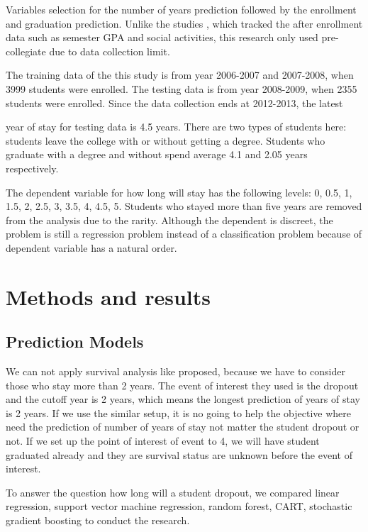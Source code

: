 \documentclass[12pt,english]{report}
\begin{document}
Variables selection for the number of years prediction followed by the
enrollment and graduation prediction. Unlike the studies \citep{Lin2009,
deberard2004predictors, dekker2009}, which tracked the after enrollment data
such as semester GPA and social activities, this research only used
pre-collegiate due to data collection limit.

The training data of the this study is from year 2006-2007 and 2007-2008, when
3999 students were enrolled. The testing data is from year 2008-2009, when 2355
students were enrolled. Since the data collection ends at 2012-2013, the latest

year of stay for testing data is 4.5 years. There are two types of students
here: students leave the college with or without getting a degree. Students who
graduate with a degree and without spend average 4.1 and 2.05 years
respectively.

The dependent variable for how long will stay has the following levels: 0, 0.5,
1, 1.5, 2, 2.5, 3, 3.5, 4, 4.5, 5. Students who stayed more than five years are
removed from the analysis due to the rarity. Although the dependent is
discreet, the problem is still a regression problem instead of a
classification problem because of dependent variable has a natural order.

\section{Methods and results}
\subsection{Prediction Models}

We can not apply survival analysis like \citep{Ameri2016} proposed,
because we have to consider those who stay more than 2 years. The event
of interest they used is the dropout and the cutoff year is 2 years,
which means the longest prediction of years of stay is 2 years. If we use
the similar setup, it is no going to help the objective where need the
prediction of number of years of stay not matter the student dropout or
not. If we set up the point of interest of event to 4, we will have
student graduated already and they are survival status are unknown before
the event of interest.

To answer the question how long will a student dropout, we compared
linear regression, support vector machine regression, random forest, CART,
stochastic gradient boosting to conduct the research. 
\end{document}
